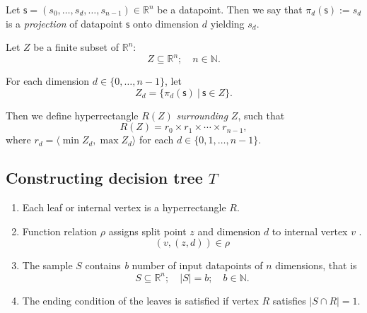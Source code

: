 
\begin{definition}
Let $\mathsf{s}=(s_0, \dots, s_d, \dots, s_{n-1})\in \mathbb{R}^n$ be a datapoint. Then we say that $\pi_d(\mathsf{s}):=s_d$ is a \emph{projection} of datapoint $\mathsf{s}$ onto dimension $d$  yielding $s_d$.
\end{definition}

\begin{definition}
Let $Z$ be a finite subset of $\mathbb{R}^n$:
$$Z \subseteq \mathbb{R}^n ;\quad n \in \mathbb{N}.$$

For each dimension \(d \in\{0, \dots, n - 1\}\), let
$$Z_d = \{ \pi_d(\mathsf{s})\ |\ \mathsf{s} \in Z \}.$$

Then we define hyperrectangle $R(Z)$ \emph{surrounding} $Z$, such that
$$R(Z) = r_0 \times r_1 \times \cdots \times r_{n-1},$$ where $r_d = \langle \min Z_d, \max Z_d \rangle$ for each $d \in \{0,1, \dots, n-1\}.$

\end{definition}


\subsection{Constructing decision tree $T$}

\begin{enumerate}

    \item Each leaf or internal vertex is a hyperrectangle $R$. 
    \item Function relation $\rho$ assigns split point $z$ and dimension $d$ to internal vertex $v$ .
    $$(v, (z,d)) \in \rho$$
    \item The sample \(S\) contains \emph{b} number of input datapoints of $n$ dimensions, that is
    $$S \subseteq \mathbb{R}^n ;\quad |S| = b; \quad b \in \mathbb{N}.$$
    \item The ending condition of the leaves is satisfied if vertex \(R\) satisfies \(| S \cap R | = 1\).
\end{enumerate}


